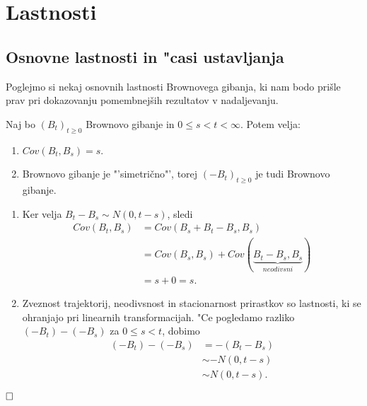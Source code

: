 \documentclass[twoside,11pt]{article}
\begin{document}
\section{Lastnosti}

\subsection{Osnovne lastnosti in "casi ustavljanja}

Poglejmo si nekaj osnovnih lastnosti Brownovega gibanja, ki nam bodo prišle prav pri dokazovanju pomembnejših rezultatov v nadaljevanju.

\begin{trditev}
    Naj bo $(B_t)_{t\geq 0}$ Brownovo gibanje in $0 \leq s < t < \infty$. Potem velja:
    \begin{enumerate}
        \item $ Cov(B_t, B_s) = s$.
        \item Brownovo gibanje je "'simetrično"', torej $(-B_{t})_{t\geq0}$ je tudi Brownovo gibanje.	
    \end{enumerate}
\end{trditev}

\begin{dokaz}
    \begin{enumerate}
        \item Ker velja $B_t - B_s \sim N(0, t-s)$, sledi
        \begin{align*}
            Cov(B_t, B_s) &= Cov(B_s + B_t - B_s, B_s) \\
                        &= Cov(B_s, B_s) + Cov(\underbrace{B_t - B_s, B_s}_{neodivsni}) \\
                        &= s + 0 = s.
        \end{align*}
        \item Zveznost trajektorij, neodivsnost in stacionarnost prirastkov so lastnosti, ki se ohranjajo pri linearnih transformacijah. "Ce pogledamo razliko $(-B_t) - (-B_s)$ 
        za $0 \leq s < t$, dobimo 
        \begin{align*}
        (-B_t) - (-B_s) &= -(B_t - B_s)\\
                        &\sim -N(0, t - s)\\
                        &\sim N(0, t-s).
        \end{align*}
    \end{enumerate}
    $\hfill \square$
\end{dokaz}

%
\end{document}
